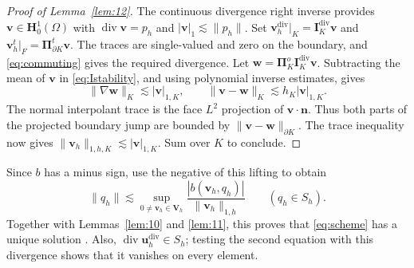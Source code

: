 \documentclass[review,hidelinks,onefignum,onetabnum]{siamart251216}
\begin{document}
\begin{proof}[Proof of Lemma~\ref{lem:12}]
The continuous divergence right inverse \cite{BBF2013} provides
$\boldsymbol v\in\boldsymbol H_0^1(\Omega)$ with
$\operatorname{div}\boldsymbol v=p_h$ and
$|\boldsymbol v|_1\lesssim\|p_h\|$.
Set $\boldsymbol v_h^{\operatorname{div}}|_K=
\boldsymbol I_K^{\operatorname{div}}\boldsymbol v$ and
$\boldsymbol v_h^t|_F=\boldsymbol\Pi_{\partial K}^t\boldsymbol v$.
The traces are single-valued and zero on the boundary, and
\eqref{eq:commuting} gives the required divergence.
Let $\boldsymbol w=\boldsymbol\Pi_K^o\boldsymbol I_K^{\operatorname{div}}\boldsymbol v$.
Subtracting the mean of $\boldsymbol v$ in \eqref{eq:Istability}, and using
polynomial inverse estimates, gives
\[
\|\nabla\boldsymbol w\|_K\lesssim|\boldsymbol v|_{1,K},
\qquad
\|\boldsymbol v-\boldsymbol w\|_K\lesssim h_K|\boldsymbol v|_{1,K}.
\]
The normal interpolant trace is the face $L^2$ projection of
$\boldsymbol v\cdot\boldsymbol n$. Thus both parts of the projected boundary
jump are bounded by $\|\boldsymbol v-\boldsymbol w\|_{\partial K}$.
The trace inequality now gives
$\|\boldsymbol v_h\|_{1,h,K}\lesssim|\boldsymbol v|_{1,K}$.
Sum over $K$ to conclude.
\end{proof}
Since $b$ has a minus sign, use the negative of this lifting to obtain
\begin{equation}\label{eq:pressure-infsup}
\|q_h\|\lesssim\sup_{0\ne\boldsymbol v_h\in\boldsymbol V_h}
\frac{|b(\boldsymbol v_h,q_h)|}{\|\boldsymbol v_h\|_{1,h}}
\qquad(q_h\in S_h).
\end{equation}
Together with Lemmas~\ref{lem:10} and \ref{lem:11}, this proves that
\eqref{eq:scheme} has a unique solution \cite{BBF2013}.
Also, $\operatorname{div}\boldsymbol u_h^{\operatorname{div}}\in S_h$;
testing the second equation with this divergence shows that it vanishes
on every element.
\end{document}
